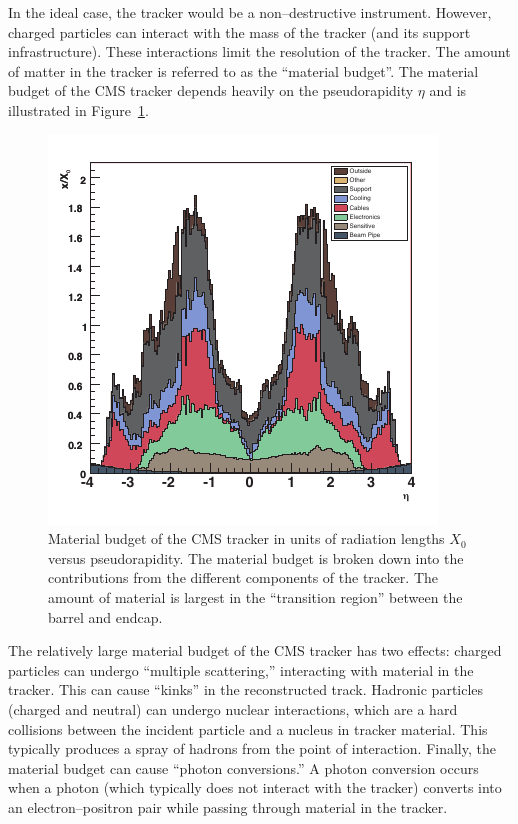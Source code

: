 In the ideal case, the tracker would be a non--destructive instrument.  However,
charged particles can interact with the mass of the tracker (and its support
infrastructure).  These interactions limit the resolution of the tracker.  The
amount of matter in the tracker is referred to as the ``material budget''.  The
material budget of the CMS tracker depends heavily on the pseudorapidity $\eta$
and is illustrated in Figure~\ref{fig:TrackerMaterialBudget}.
\begin{figure}
  \centering
  \includegraphics[]{detector_chapter/figures/tracker_material_budget_cleaned.pdf}
  \caption[Material budget of the CMS tracker]{Material budget of the CMS
  tracker in units of radiation lengths $X_0$ versus pseudorapidity.  The
  material budget is broken down into the contributions from the different
  components of the tracker.  The amount of material is largest in the
  ``transition region'' between the barrel and endcap.  }
  \label{fig:TrackerMaterialBudget}
\end{figure}
The relatively large material budget of the CMS tracker has two effects: charged
particles can undergo ``multiple scattering,'' interacting with material in the
tracker.  This can cause ``kinks'' in the reconstructed track.   Hadronic
particles (charged and neutral) can undergo nuclear interactions, which are a
hard collisions between the incident particle and a nucleus in tracker material.
This typically produces a spray of hadrons from the point of interaction.
Finally, the material budget can cause ``photon conversions.''  A photon
conversion occurs when a photon (which typically does not interact with the
tracker) converts into an electron--positron pair while passing through material
in the tracker.  

